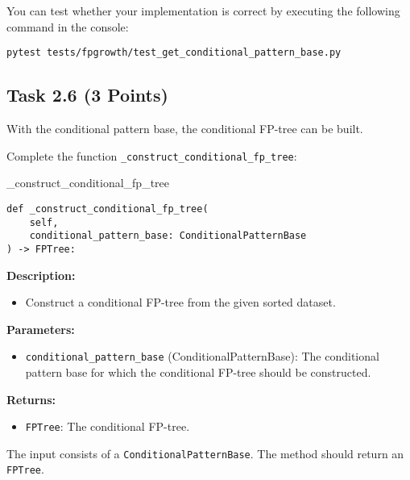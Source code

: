 \documentclass[
english,
smallborders
]{i6prcsht}
\newcommand{\points}[1]{\hfill \color{red}(#1 Points)\color{black}}
\begin{document}
You can test whether your implementation is correct by executing the following command in the console:

\vspace*{0.3cm}

\begin{lstlisting}
pytest tests/fpgrowth/test_get_conditional_pattern_base.py
\end{lstlisting}


\newpage

\subsection*{Task 2.6 \points{3}}

With the conditional pattern base, the conditional FP-tree can be built.

Complete the function \texttt{\_construct\_conditional\_fp\_tree}:

\vspace*{0.3cm}

\begin{functionbox}{\_construct\_conditional\_fp\_tree}
	\begin{lstlisting}[numbers=none]
def _construct_conditional_fp_tree(
    self, 
    conditional_pattern_base: ConditionalPatternBase
) -> FPTree:
\end{lstlisting}
	
	\textbf{Description:}
	\begin{itemize}[leftmargin=*,topsep=0pt]
		\item Construct a conditional FP-tree from the given sorted dataset.
	\end{itemize}
	
	\textbf{Parameters:}
	\begin{itemize}[leftmargin=*,topsep=0pt]
		\item \texttt{conditional\_pattern\_base} (ConditionalPatternBase): The conditional pattern base for which the conditional FP-tree should be constructed.
	\end{itemize}
	
	\textbf{Returns:}
	\begin{itemize}[leftmargin=*,topsep=0pt]
		\item \texttt{FPTree}: The conditional FP-tree.
	\end{itemize}
\end{functionbox}

\vspace*{0.5cm}

The input consists of a \texttt{ConditionalPatternBase}. The method should return an \texttt{FPTree}.
\end{document}
